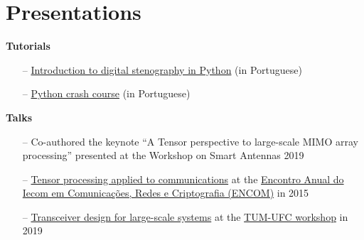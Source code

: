 \section{Presentations}

{\bf Tutorials}\\
\begin{itemize}
	\item[--] \href{https://github.com/lnribeiro/setic2015/blob/master/esteganografia.ipynb}{Introduction to digital stenography in Python} (in Portuguese)
	\item[--] \href{https://github.com/lnribeiro/setic2015/blob/master/intropython.ipynb}{Python crash course} (in Portuguese)
\end{itemize}

{\bf Talks}\\
\begin{itemize}
	\item[--] Co-authored the keynote ``A Tensor perspective to large-scale MIMO array processing'' presented at the  Workshop on Smart Antennas 2019
	\item[--] \href{https://github.com/lnribeiro/lnribeiro.github.io/blob/master/assets/pdf/encom15.pdf}{Tensor processing applied to communications} at the \href{https://iecom.org.br/encom2015/#}{Encontro Anual do Iecom em Comunicaç\~{o}es, Redes e Criptografia (ENCOM)} in 2015
	\item[--] \href{http://lnribeiro.github.io/assets/pdf/tum19.pdf}{Transceiver design for large-scale systems} at the \href{http://www.msv.ei.tum.de/workshop-tum-ufc/}{TUM-UFC workshop} in 2019
\end{itemize}
